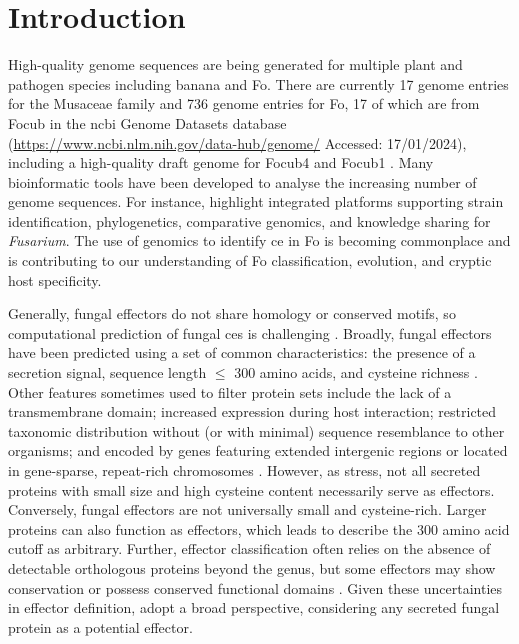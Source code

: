 \section{Introduction}
\label{sec:Chap3Intro}

High-quality genome sequences are being generated for multiple plant and pathogen species including banana and \ac{Fo}. There are currently 17 genome entries for the Musaceae family and 736 genome entries for \ac{Fo}, 17 of which are from \ac{Focub} in the \ac{ncbi} Genome Datasets database (\href{https://www.ncbi.nlm.nih.gov/data-hub/genome/}{https://www.ncbi.nlm.nih.gov/data-hub/genome/} Accessed: 17/01/2024), including a high-quality draft genome for \ac{Focub4} \parencite{Warmington2019} and \ac{Focub1} \parencite{Asai2019}. Many bioinformatic tools have been developed to analyse the increasing number of genome sequences. For instance, \textcite{Park2010} highlight integrated platforms supporting strain identification, phylogenetics, comparative genomics, and knowledge sharing for \textit{Fusarium}. The use of genomics to identify \acf{ce} in \ac{Fo} is becoming commonplace and is contributing to our understanding of \ac{Fo} classification, evolution, and cryptic host specificity. 

Generally, fungal effectors do not share homology or conserved motifs, so computational prediction of fungal \acp{ce} is challenging \parencite{Sperschneider2022, Todd2022}. Broadly, fungal effectors have been predicted using a set of common characteristics: the presence of a secretion signal, sequence length $\leq$ 300 amino acids, and cysteine richness \parencite{Sperschneider2015}. Other features sometimes used to filter protein sets include the lack of a transmembrane domain; increased expression during host interaction; restricted taxonomic distribution without (or with minimal) sequence resemblance to other organisms; and encoded by genes featuring extended intergenic regions or located in gene-sparse, repeat-rich chromosomes \parencite{Dalio2018, Todd2022}. However, as \textcite{LoPresti2015, Sperschneider2015} stress, not all secreted proteins with small size and high cysteine content necessarily serve as effectors. Conversely, fungal effectors are not universally small and cysteine-rich. Larger proteins can also function as effectors, which leads \textcite{LoPresti2015} to describe the 300 amino acid cutoff as arbitrary. Further, effector classification often relies on the absence of detectable orthologous proteins beyond the genus, but some effectors may show conservation or possess conserved functional domains \parencite{Jonge2010, Djamei2011, Mentlak2012}. Given these uncertainties in effector definition, \textcite{LoPresti2015} adopt a broad perspective, considering any secreted fungal protein as a potential effector. 

